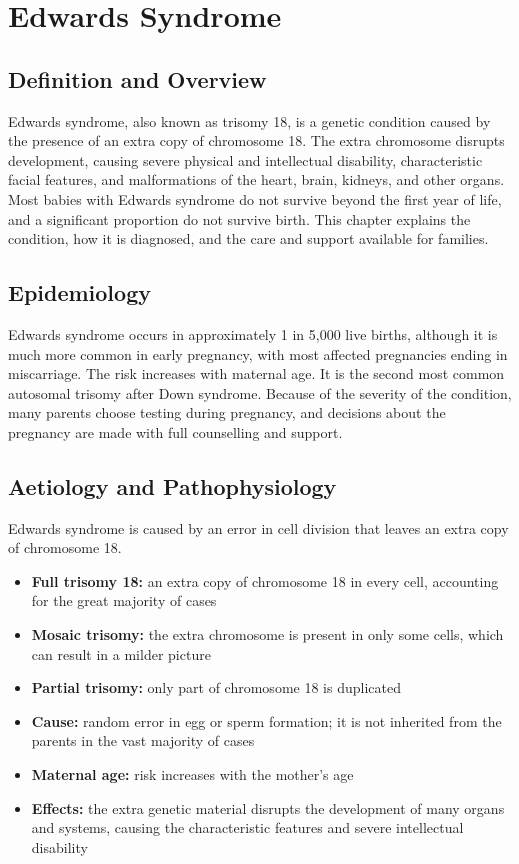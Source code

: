 \chapter{Edwards Syndrome}

\section*{Definition and Overview}
Edwards syndrome, also known as trisomy 18, is a genetic condition caused by the presence of an extra copy of chromosome 18. The extra chromosome disrupts development, causing severe physical and intellectual disability, characteristic facial features, and malformations of the heart, brain, kidneys, and other organs. Most babies with Edwards syndrome do not survive beyond the first year of life, and a significant proportion do not survive birth. This chapter explains the condition, how it is diagnosed, and the care and support available for families.

\section*{Epidemiology}
Edwards syndrome occurs in approximately 1 in 5,000 live births, although it is much more common in early pregnancy, with most affected pregnancies ending in miscarriage. The risk increases with maternal age. It is the second most common autosomal trisomy after Down syndrome. Because of the severity of the condition, many parents choose testing during pregnancy, and decisions about the pregnancy are made with full counselling and support.

\section*{Aetiology and Pathophysiology}
Edwards syndrome is caused by an error in cell division that leaves an extra copy of chromosome 18.
\begin{itemize}
    \item \textbf{Full trisomy 18:} an extra copy of chromosome 18 in every cell, accounting for the great majority of cases
    \item \textbf{Mosaic trisomy:} the extra chromosome is present in only some cells, which can result in a milder picture
    \item \textbf{Partial trisomy:} only part of chromosome 18 is duplicated
    \item \textbf{Cause:} random error in egg or sperm formation; it is not inherited from the parents in the vast majority of cases
    \item \textbf{Maternal age:} risk increases with the mother's age
    \item \textbf{Effects:} the extra genetic material disrupts the development of many organs and systems, causing the characteristic features and severe intellectual disability
\end{itemize}

